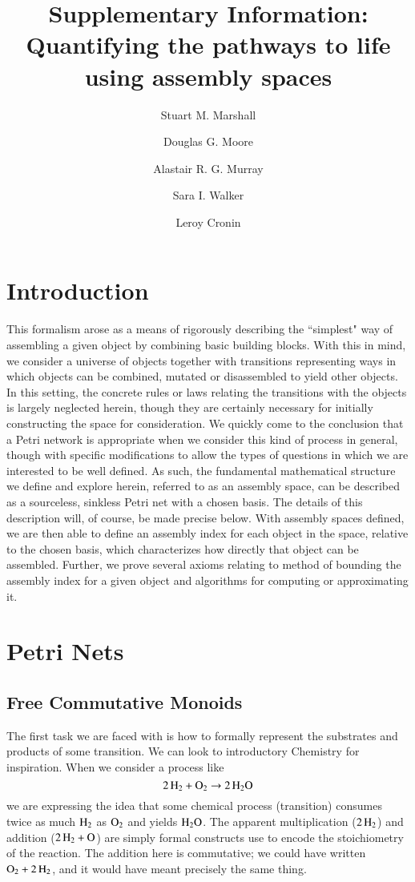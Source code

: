 \documentclass[aps,prd,onecolumn,nofootinbib,letterpaper,preprintnumbers,superscriptaddress,eqsecnum]{revtex4}
\theoremstyle{definition}
\begin{document}
\title{Supplementary Information: Quantifying the pathways to life using assembly spaces}
\author{Stuart M. Marshall}
\author{Douglas G. Moore}
\author{Alastair R. G. Murray}
\author{Sara I. Walker}
\author{Leroy Cronin}

\maketitle

\section{Introduction}

This formalism arose as a means of rigorously describing the ``simplest" way of assembling a given object by combining basic building blocks.
With this in mind, we consider a universe of objects together with transitions representing ways in which objects can be combined, mutated or disassembled to yield other objects.
In this setting, the concrete rules or laws relating the transitions with the objects is largely neglected herein, though they are certainly necessary for initially constructing the space for consideration.
We quickly come to the conclusion that a Petri network is appropriate when we consider this kind of process in general, though with specific modifications to allow the types of questions in which we are interested to be well defined.
As such, the fundamental mathematical structure we define and explore herein, referred to as an assembly space, can be described as a sourceless, sinkless Petri net with a chosen basis.
The details of this description will, of course, be made precise below.
With assembly spaces defined, we are then able to define an assembly index for each object in the space, relative to the chosen basis, which characterizes how directly that object can be assembled.
Further, we prove several axioms relating to method of bounding the assembly index for a given object and algorithms for computing or approximating it.

\section{Petri Nets}

\subsection{Free Commutative Monoids}

The first task we are faced with is how to formally represent the substrates and products of some transition.
We can look to introductory Chemistry for inspiration.
When we consider a process like
\begin{equation*}
    \ce{2H_2} + \ce{O_2} \rightarrow \ce{2H_2O}
\end{equation*}
we are expressing the idea that some chemical process (transition) consumes twice as much $\ce{H_2}$ as $\ce{O_2}$ and yields $\ce{H_2O}$.
The apparent multiplication ($\ce{2H_2}$) and addition ($\ce{2H_2} + \ce{O_}$) are simply formal constructs use to encode the stoichiometry of the reaction.
The addition here is commutative; we could have written $\ce{O_2} + \ce{2H_2}$, and it would have meant precisely the same thing.
\end{document}
